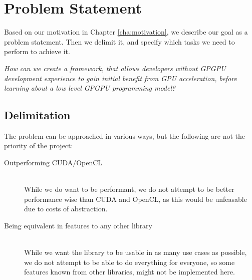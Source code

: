 \section{Problem Statement}
Based on our motivation in Chapter \ref{cha:motivation}, we describe our goal as a problem statement. Then we delimit it, and specify which tasks we need to perform to achieve it.

\textit{How can we create a framework, that allows developers without GPGPU development experience to gain initial benefit from GPU acceleration, before learning about a low level GPGPU programming model?}

\subsection{Delimitation}
The problem can be approached in various ways, but the following are not the priority of the project:
\begin{description}
\item[Outperforming CUDA/OpenCL] \hfill \\
While we do want to be performant, we do not attempt to be better performance wise than CUDA and OpenCL, as this would be unfeasable due to costs of abstraction.
\item[Being equivalent in features to any other library] \hfill \\
While we want the library to be usable in as many use cases as possible, we do not attempt to be able to do everything for everyone, so some features known from other libraries, might not be implemented here.
\end{description}

